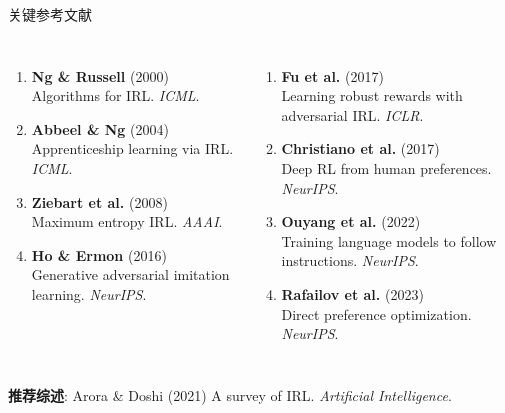\documentclass[aspectratio=169, 11pt]{beamer}
\begin{document}
\begin{frame}{关键参考文献}
  \vspace{-0.3cm}
  \begin{columns}[T]
    \footnotesize
    \begin{enumerate}\setlength\itemsep{6pt}
      \item \textbf{Ng \& Russell} (2000)\\
        {\color{muted} Algorithms for IRL. \textit{ICML}.}
      \item \textbf{Abbeel \& Ng} (2004)\\
        {\color{muted} Apprenticeship learning via IRL. \textit{ICML}.}
      \item \textbf{Ziebart et al.} (2008)\\
        {\color{muted} Maximum entropy IRL. \textit{AAAI}.}
      \item \textbf{Ho \& Ermon} (2016)\\
        {\color{muted} Generative adversarial imitation learning. \textit{NeurIPS}.}
    \end{enumerate}

    \footnotesize
    \begin{enumerate}\setlength\itemsep{6pt}
      \setcounter{enumi}{4}
      \item \textbf{Fu et al.} (2017)\\
        {\color{muted} Learning robust rewards with adversarial IRL. \textit{ICLR}.}
      \item \textbf{Christiano et al.} (2017)\\
        {\color{muted} Deep RL from human preferences. \textit{NeurIPS}.}
      \item \textbf{Ouyang et al.} (2022)\\
        {\color{muted} Training language models to follow instructions. \textit{NeurIPS}.}
      \item \textbf{Rafailov et al.} (2023)\\
        {\color{muted} Direct preference optimization. \textit{NeurIPS}.}
    \end{enumerate}
  \end{columns}

  \vspace{0.3cm}
  \begin{center}
    \begin{tcolorbox}[colback=light, colframe=primary!30,
        arc=4pt, boxsep=4pt, width=0.9\textwidth]
      \centering\small
      \textbf{推荐综述}: Arora \& Doshi (2021)\quad
      A survey of IRL. \textit{Artificial Intelligence}.
    \end{tcolorbox}
  \end{center}

\end{frame}
\end{document}

